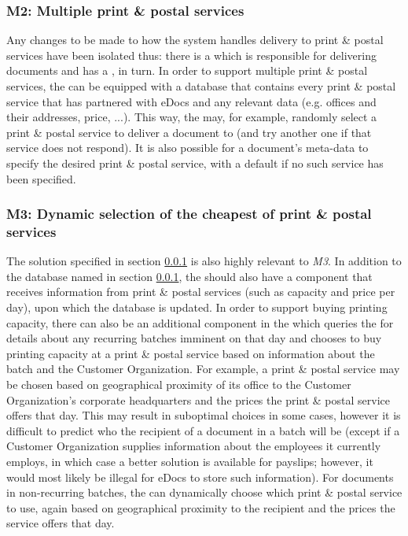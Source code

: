\subsubsection{M2: Multiple print \& postal services}\label{march:m2}
Any changes to be made to how the system handles delivery to print \& postal services have been isolated thus: there is a  which is responsible for delivering documents and has a , in turn. In order to support multiple print \& postal services, the  can be equipped with a database that contains every print \& postal service that has partnered with eDocs and any relevant data (e.g. offices and their addresses, price, ...). This way, the  may, for example, randomly select a print \& postal service to deliver a document to (and try another one if that service does not respond). It is also possible for a document's meta-data to specify the desired print \& postal service, with a default if no such service has been specified.

\subsubsection{M3: Dynamic selection of the cheapest of print \& postal services}\label{march:m3}
The solution specified in section \ref{march:m2} is also highly relevant to \emph{M3}. In addition to the database named in section \ref{march:m2}, the  should also have a component that receives information from print \& postal services (such as capacity and price per day), upon which the database is updated. In order to support buying printing capacity, there can also be an additional component in the  which queries the  for details about any recurring batches imminent on that day and chooses to buy printing capacity at a print \& postal service based on information about the batch and the Customer Organization. For example, a print \& postal service may be chosen based on geographical proximity of its office to the Customer Organization's corporate headquarters and the prices the print \& postal service offers that day. This may result in suboptimal choices in some cases, however it is difficult to predict who the recipient of a document in a batch will be (except if a Customer Organization supplies information about the employees it currently employs, in which case a better solution is available for payslips; however, it would most likely be illegal for eDocs to store such information). For documents in non-recurring batches, the  can dynamically choose which print \& postal service to use, again based on geographical proximity to the recipient and the prices the service offers that day.
